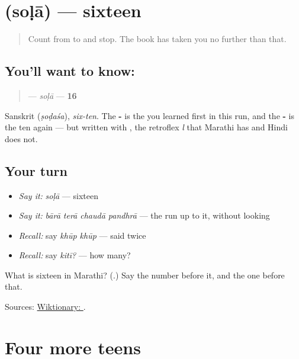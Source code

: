 \section[\texorpdfstring{\mr{सोळा} (soḷā)}{सोळा (soḷā)}]{ (soḷā) — sixteen}

\label{lesson:MR-C57-sola}



\begin{quote}
Count from \textbf{} to \textbf{} and stop. The book has taken you no further than that.
\end{quote}

\subsection*{You'll want to know: }
\begin{quote}
\textbf{} — \emph{soḷā} — \textbf{16}
\end{quote}

Sanskrit \textbf{} (\emph{ṣoḍaśa}), \emph{six-ten}. The \textbf{-} is the \textbf{} you learned first in this run, and the \textbf{-} is the ten again — but written with \textbf{}, the retroflex \emph{l} that Marathi has and Hindi does not.

\subsection*{Your turn}
\begin{itemize}
\raggedright
  \item \emph{Say it:} \emph{soḷā} — sixteen
  \item \emph{Say it:} \emph{bārā terā chaudā pandhrā} — the run up to it, without looking
  \item \emph{Recall:} say \emph{khūp khūp} — said twice
  \item \emph{Recall:} say \emph{kitī?} — how many?
\end{itemize}

\begin{tcolorbox}[breakable,colback=teal!4,colframe=teal!35!black,title={Before you move on}]
What is sixteen in Marathi? (\textbf{}.) Say the number before it, and the one before that.

Sources: \href{https://en.wiktionary.org/wiki/\%E0\%A4\%B8\%E0\%A5\%8B\%E0\%A4\%B3\%E0\%A4\%BE}{Wiktionary: }.
\end{tcolorbox}
\section[\texorpdfstring{\mr{तेरा} · \mr{चौदा} … (terā · chaudā …)}{तेरा · चौदा … (terā · chaudā …)}]{Four more teens}

